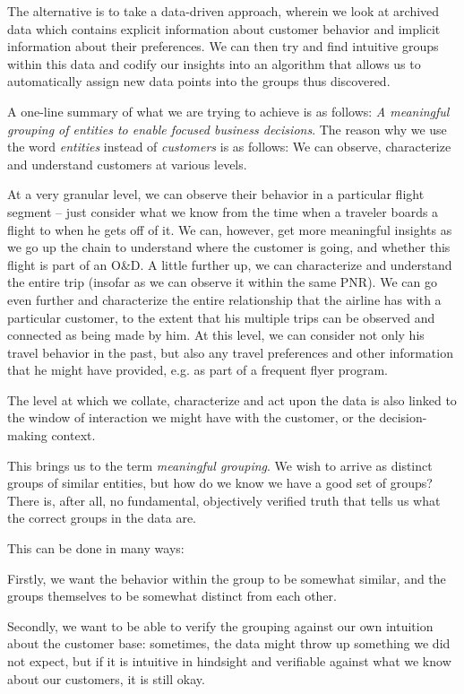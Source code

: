 The alternative is to take a data-driven approach, wherein we look at archived data which contains explicit information about customer behavior and implicit information about their preferences. We can then try and find intuitive groups within this data and codify our insights into an algorithm that allows us to automatically assign new data points into the groups thus discovered.

A one-line summary of what we are trying to achieve is as follows: \textit{A meaningful grouping of entities to enable focused business decisions}. The reason why we use the word \textit{entities} instead of \textit{customers} is as follows: We can observe, characterize and understand customers at various levels. 

At a very granular level, we can observe their behavior in a particular flight segment – just consider what we know from the time when a traveler boards a flight to when he gets off of it. We can, however, get more meaningful insights as we go up the chain to understand where the customer is going, and whether this flight is part of an O&D. A little further up, we can characterize and understand the entire trip (insofar as we can observe it within the same PNR). We can go even further and characterize the entire relationship that the airline has with a particular customer, to the extent that his multiple trips can be observed and connected as being made by him. At this level, we can consider not only his travel behavior in the past, but also any travel preferences and other information that he might have provided, e.g. as part of a frequent flyer program.

The level at which we collate, characterize and act upon the data is also linked to the window of interaction we might have with the customer, or the decision-making context. 

This brings us to the term \textit{meaningful grouping}. We wish to arrive as distinct groups of similar entities, but how do we know we have a good set of groups? There is, after all, no fundamental, objectively verified truth that tells us what the correct groups in the data are. 

This can be done in many ways: 

Firstly, we want the behavior within the group to be somewhat similar, and the groups themselves to be somewhat distinct from each other. 

Secondly, we want to be able to verify the grouping against our own intuition about the customer base: sometimes, the data might throw up something we did not expect, but if it is intuitive in hindsight and verifiable against what we know about our customers, it is still okay. 

